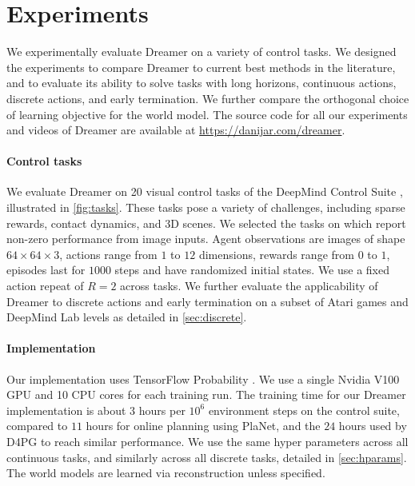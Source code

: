 \section{Experiments}
\label{sec:experiments}



We experimentally evaluate Dreamer on a variety of control tasks. We designed the experiments to compare Dreamer to current best methods in the literature, and to evaluate its ability to solve tasks with long horizons, continuous actions, discrete actions, and early termination. We further compare the orthogonal choice of learning objective for the world model. The source code for all our experiments and videos of Dreamer are available at \mbox{\url{https://danijar.com/dreamer}}.

\paragraph{Control tasks}

We evaluate Dreamer on 20 visual control tasks of the DeepMind Control Suite \cite{tassa2018dmcontrol}, illustrated in \cref{fig:tasks}. These tasks pose a variety of challenges, including sparse rewards, contact dynamics, and 3D scenes. We selected the tasks on which \citet{tassa2018dmcontrol} report non-zero performance from image inputs. Agent observations are images of shape $64\times64\times3$, actions range from $1$ to $12$ dimensions, rewards range from $0$ to $1$, episodes last for $1000$ steps and have randomized initial states. We use a fixed action repeat of $R=2$ across tasks. We further evaluate the applicability of Dreamer to discrete actions and early termination on a subset of Atari games \citep{bellemare2013ale} and DeepMind Lab levels \citep{beattie2016dmlab} as detailed in \cref{sec:discrete}.

\paragraph{Implementation}

Our implementation uses TensorFlow Probability \citep{dillon2017tfd}. We use a single Nvidia V100 GPU and 10 CPU cores for each training run. The training time for our Dreamer implementation is about $3$ hours per $10^6$ environment steps on the control suite, compared to $11$ hours for online planning using PlaNet, and the $24$ hours used by D4PG to reach similar performance. We use the same hyper parameters across all continuous tasks, and similarly across all discrete tasks, detailed in \cref{sec:hparams}. The world models are learned via reconstruction unless specified.

